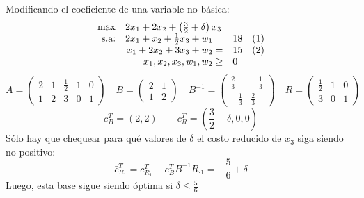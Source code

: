 \documentclass[10pt, aspectratio=169]{beamer}
\begin{document}
\begin{frame}{}\small
    Modificando el coeficiente de una variable no básica:
    $$
    \begin{array}{rrlc}
    \max & \multicolumn{2}{l}{2x_1+2x_2+\left(\frac{3}{2}+\delta\right)x_3}\\
    \text{s.a:}& 2x_1+x_2+\frac{1}{2}x_3 + w_1 = & 18 & (1)\\
     & x_1+2x_2+3x_3 + w_2 = & 15 & (2)\\
     & x_1, x_2, x_3, w_1, w_2\geq & 0 \\
    \end{array}
    $$
        \[A=
    \left(\begin{matrix} 
    2 & 1 & \frac{1}{2} & 1 & 0 \\
    1 & 2 & 3 & 0 & 1
    \end{matrix}\right)
    \quad 
    B=\left(
    \begin{matrix}
    2 & 1 \\
    1 & 2
    \end{matrix}
    \right)
    \quad
        B^{-1}=\left(
    \begin{matrix}
    \frac{2}{3} & -\frac{1}{3} \\
    -\frac{1}{3} & \frac{2}{3}
    \end{matrix}
    \right)
    \quad
    R=\left(
    \begin{matrix}
    \frac{1}{2} & 1 & 0 \\
    3 & 0 & 1
    \end{matrix}
    \right)
    \]
    \[ c_B^T=(2,2) \qquad c_R^T=(\frac{3}{2}+\delta,0,0)
    \]
    Sólo hay que chequear para qué valores de $\delta$ el costo reducido de $x_3$ siga siendo no positivo:
    \[\bar{c}_{R_1}^T = c_{R_1}^T - c_B^TB^{-1}R_{\cdot1} = -\frac{5}{6}+\delta  \]
    Luego, esta base sigue siendo óptima si $\delta\leq \frac{5}{6}$

\end{frame}
\end{document}
